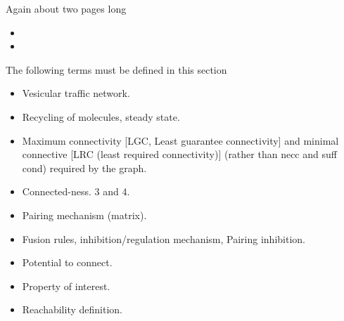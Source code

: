 Again about two pages long

\begin{itemize}
\item {}
\item {}
\end{itemize}

The following terms must be defined in this section

\begin{itemize}
\item Vesicular traffic network.
\item Recycling of molecules, steady state.
\item Maximum connectivity [LGC, Least guarantee connectivity] and minimal connective [LRC (least required connectivity)] (rather than necc and suff cond) required by the graph. 
\item Connected-ness. 3 and 4.
\item Pairing mechanism (matrix).
\item Fusion rules, inhibition/regulation mechanism, Pairing inhibition.
\item Potential to connect.
\item Property of interest.
\item Reachability definition.
\end{itemize}





